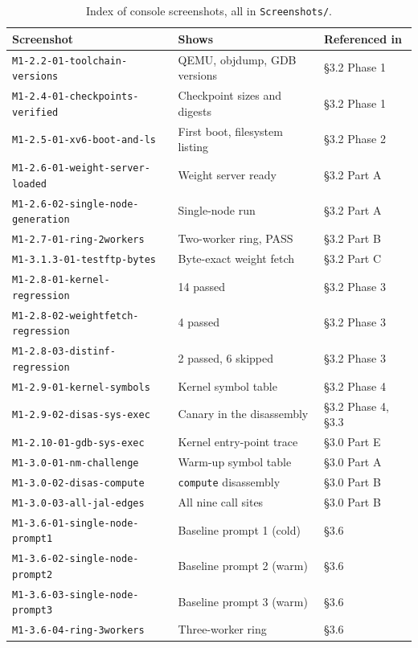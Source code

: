 \documentclass[11pt]{article}
\renewcommand{\_}{\origunderscore\allowbreak}
\begin{document}
\begin{table}[H]
\centering
\small
\begin{tabular}{@{}lll@{}}
\toprule
\textbf{Screenshot} & \textbf{Shows} & \textbf{Referenced in} \\
\midrule
\texttt{M1-2.2-01-toolchain-versions}   & QEMU, objdump, GDB versions        & \S3.2 Phase 1 \\
\texttt{M1-2.4-01-checkpoints-verified} & Checkpoint sizes and digests       & \S3.2 Phase 1 \\
\texttt{M1-2.5-01-xv6-boot-and-ls}      & First boot, filesystem listing     & \S3.2 Phase 2 \\
\texttt{M1-2.6-01-weight-server-loaded} & Weight server ready                & \S3.2 Part A \\
\texttt{M1-2.6-02-single-node-generation} & Single-node run                  & \S3.2 Part A \\
\texttt{M1-2.7-01-ring-2workers}        & Two-worker ring, PASS              & \S3.2 Part B \\
\texttt{M1-3.1.3-01-testftp-bytes}      & Byte-exact weight fetch            & \S3.2 Part C \\
\texttt{M1-2.8-01-kernel-regression}    & 14 passed                          & \S3.2 Phase 3 \\
\texttt{M1-2.8-02-weightfetch-regression} & 4 passed                         & \S3.2 Phase 3 \\
\texttt{M1-2.8-03-distinf-regression}   & 2 passed, 6 skipped                & \S3.2 Phase 3 \\
\texttt{M1-2.9-01-kernel-symbols}       & Kernel symbol table                & \S3.2 Phase 4 \\
\texttt{M1-2.9-02-disas-sys-exec}       & Canary in the disassembly          & \S3.2 Phase 4, \S3.3 \\
\texttt{M1-2.10-01-gdb-sys-exec}        & Kernel entry-point trace           & \S3.0 Part E \\
\texttt{M1-3.0-01-nm-challenge}         & Warm-up symbol table               & \S3.0 Part A \\
\texttt{M1-3.0-02-disas-compute}        & \texttt{compute} disassembly       & \S3.0 Part B \\
\texttt{M1-3.0-03-all-jal-edges}        & All nine call sites                & \S3.0 Part B \\
\texttt{M1-3.6-01-single-node-prompt1}  & Baseline prompt 1 (cold)           & \S3.6 \\
\texttt{M1-3.6-02-single-node-prompt2}  & Baseline prompt 2 (warm)           & \S3.6 \\
\texttt{M1-3.6-03-single-node-prompt3}  & Baseline prompt 3 (warm)           & \S3.6 \\
\texttt{M1-3.6-04-ring-3workers}        & Three-worker ring                  & \S3.6 \\
\bottomrule
\end{tabular}
\caption{Index of console screenshots, all in \texttt{Screenshots/}.}
\label{tab:evidence-index}
\end{table}
\end{document}

